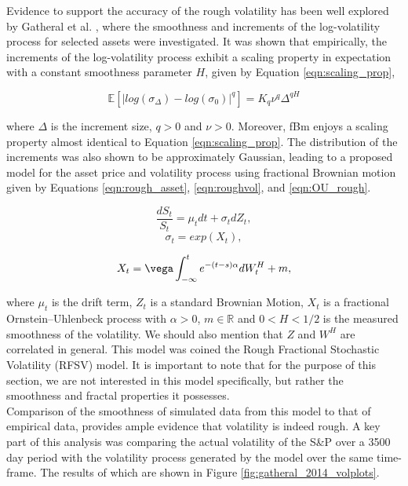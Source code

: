 \documentclass[12pt,oneside]{article}
\begin{document}
Evidence to support the accuracy of the rough volatility  has been well explored by Gatheral et al. \cite{Gatheral2014}, where the smoothness and increments of the log-volatility process for selected assets were investigated. It was shown that empirically, the increments of the log-volatility process exhibit a scaling property in expectation with a constant smoothness parameter $H$, given by Equation \ref{eqn:scaling_prop}, 

\begin{equation}
\label{eqn:scaling_prop}
\mathbb{E}[|log(\sigma_\Delta)-log(\sigma_0)|^q]=K_q\nu^q\Delta^{qH}
\end{equation}

where $\Delta$ is the increment size, $q>0$ and $\nu>0$. Moreover, fBm enjoys a scaling property almost identical to Equation \ref{eqn:scaling_prop}. The distribution of the increments was also shown to be  approximately Gaussian, leading  to a proposed model for the asset price and volatility process using fractional Brownian motion given by Equations \ref{eqn:rough_asset}, \ref{eqn:roughvol}, and \ref{eqn:OU_rough}.

\begin{equation}
\label{eqn:rough_asset}
 \frac{dS_{t}}{S_{t}} = \mu_{t} dt + \sigma_{t} dZ_{t},
\end{equation}
\begin{equation}
\label{eqn:roughvol}
    \sigma_{t} = exp(X_{t}),
\end{equation}

\begin{equation}
\label{eqn:OU_rough}
X_{t}=\vega\int_{-\infty}^{t} e^{-(t-s)\alpha}dW_{t}^{H}+m,
\end{equation}

where $\mu_{t}$ is the drift term, $Z_{t}$ is a standard Brownian Motion, $X_{t}$ is a fractional Ornstein–Uhlenbeck process with $\alpha>0$, $m\in\mathbb{R}$ and $0<H<1/2$ is the measured smoothness of the volatility. We should also mention that $Z$ and $W^{H}$ are correlated in general. This model was coined the Rough Fractional Stochastic Volatility (RFSV) model. It is important to note that for the purpose of this section, we are not interested in this model specifically, but rather the smoothness and fractal properties it possesses.
\\

Comparison of the smoothness of simulated data from this model to that of empirical data, provides ample evidence that volatility is indeed rough. A key part of this analysis was comparing the actual volatility of the S\&P over a 3500 day period with the volatility process generated by the model over the same time-frame. The results of which are shown in Figure \ref{fig:gatheral_2014_volplots}.
\\
\end{document}
